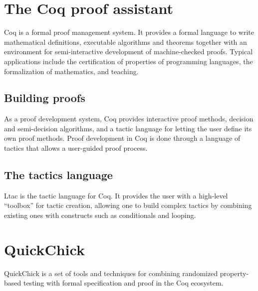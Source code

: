 \section{The Coq proof assistant}
\label{section:coq}

Coq is a formal proof management system. It provides a formal language to write mathematical definitions, executable algorithms and theorems together with an environment for semi-interactive development of machine-checked proofs. Typical applications include the certification of properties of programming languages, the formalization of mathematics, and teaching. 

\subsection{Building proofs}

As a proof development system, Coq provides interactive proof methods, decision and semi-decision algorithms, and a tactic language for letting the user define its own proof methods. Proof development in Coq is done through a language of tactics that allows a user-guided proof process.

\subsection{The tactics language}

Ltac is the tactic language for Coq. It provides the user with a high-level “toolbox” for tactic creation, allowing one to build complex tactics by combining existing ones with constructs such as conditionals and looping.

\section{QuickChick}
\label{section:quickchick}

QuickChick is a set of tools and techniques for combining randomized property-based testing with formal specification and proof in the Coq ecosystem.